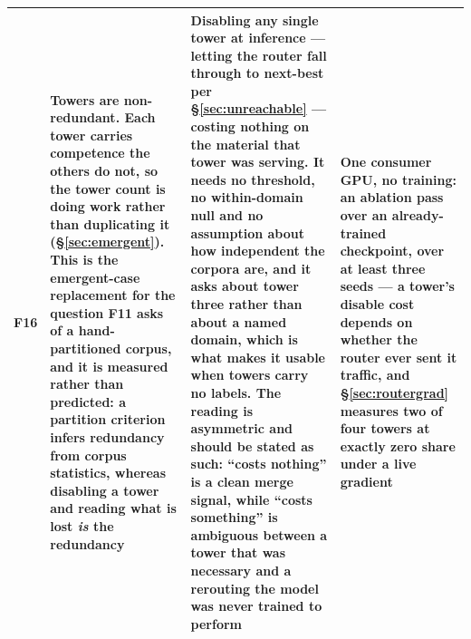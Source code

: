 \documentclass[11pt]{article}
\begin{document}
\begin{longtable}{@{}p{}p{}p{}p{}@{}}
\addlinespace
F16 & \textbf{Towers are non-redundant.} Each tower carries competence the others do not, so the tower count is doing work rather than duplicating it (\S\ref{sec:emergent}). This is the emergent-case replacement for the question F11 asks of a hand-partitioned corpus, and it is measured rather than predicted: a partition criterion infers redundancy from corpus statistics, whereas disabling a tower and reading what is lost \emph{is} the redundancy & Disabling any single tower at inference --- letting the router fall through to next-best per \S\ref{sec:unreachable} --- costing nothing on the material that tower was serving. It needs no threshold, no within-domain null and no assumption about how independent the corpora are, and it asks about tower three rather than about a named domain, which is what makes it usable when towers carry no labels. The reading is asymmetric and should be stated as such: ``costs nothing'' is a clean merge signal, while ``costs something'' is ambiguous between a tower that was necessary and a rerouting the model was never trained to perform & One consumer GPU, no training: an ablation pass over an already-trained checkpoint, \textbf{over at least three seeds} --- a tower's disable cost depends on whether the router ever sent it traffic, and \S\ref{sec:routergrad} measures two of four towers at exactly zero share under a live gradient \\
\bottomrule
\end{longtable}
\end{document}
